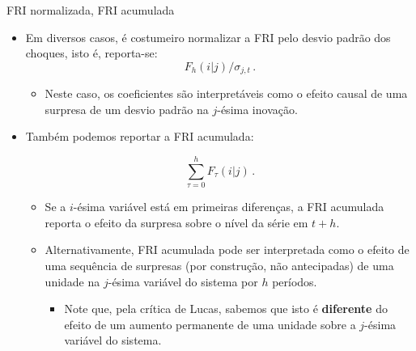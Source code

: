 \documentclass[11pt]{beamer}
\begin{document}
\begin{frame}{FRI normalizada, FRI acumulada}
\begin{itemize}
	\item Em diversos casos, é costumeiro normalizar a FRI pelo desvio padrão dos choques, isto é, reporta-se:
	$$F_h(i|j)/\sigma_{j,t}\,.$$
	
	\begin{itemize}
		\item 	Neste caso, os coeficientes são interpretáveis como o efeito causal de uma surpresa de um desvio padrão na $j$-ésima inovação.
	\end{itemize}
	\item Também podemos reportar a FRI acumulada:
	
	$$\sum_{\tau=0}^h F_\tau(i|j)\, .$$
	
	\begin{itemize}
		\item Se a $i$-ésima variável está em primeiras diferenças, a FRI acumulada reporta o efeito da surpresa sobre o nível da série em $t+h$.
		\item Alternativamente, FRI acumulada pode ser interpretada como o efeito de uma sequência de surpresas (por construção, não antecipadas) de uma unidade na $j$-ésima variável do sistema por $h$ períodos.
		\begin{itemize}
			\item Note que, pela crítica de Lucas, sabemos que isto é \textbf{diferente} do efeito de um aumento permanente de uma unidade sobre a $j$-ésima variável do sistema.
		\end{itemize}
	\end{itemize}
	
\end{itemize}
\end{frame}
\end{document}
